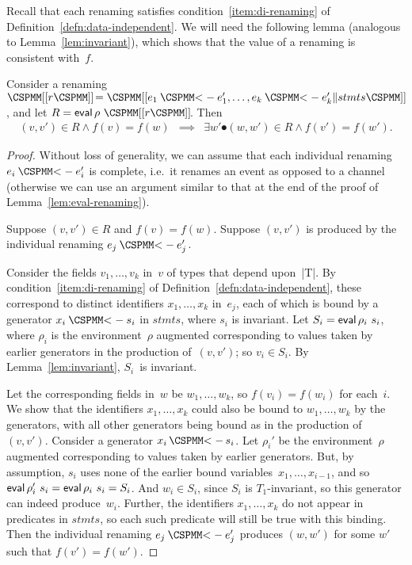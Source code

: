 
Recall that each renaming satisfies condition~\ref{item:di-renaming} of
Definition~\ref{defn:data-independent}.  We will need the following lemma
(analogous to Lemma~\ref{lem:invariant}),
which shows that the value of a renaming is consistent with~$f$.
%
\begin{lemma}
\label{lem:renaming-invariant}
Consider a renaming $\rename{r} = \rename{ e_1 \lArrow e_1', \ldots, e_k
  \lArrow e_k' \| stmts}$, and let $R = \eval \rho~ \rename{r}$.  Then
%
\begin{eqnarray*}
(v,v') \in R \land f(v) = f(w) & \implies &
  \exists w' \spot (w,w') \in R \land f(v') = f(w').
\end{eqnarray*}
\end{lemma}


\begin{proof}
Without loss of generality, we can assume that each individual renaming
$e_i \lArrow e_i'$ is complete, i.e.~it renames an event as opposed to a
channel (otherwise we can use an argument similar to that at the end of the
proof of Lemma~\ref{lem:eval-renaming}).

Suppose $(v,v') \in R$ and $f(v) = f(w)$.  Suppose $(v,v')$ is produced by the
individual renaming $e_j \lArrow e_j'$.  

Consider the fields $v_1,\ldots,v_k$ in~$v$ of types that depend upon~|T|.  By
condition~\ref{item:di-renaming} of Definition~\ref{defn:data-independent},
these correspond to distinct identifiers $x_1,\ldots,x_k$ in~$e_j$, each of
which is bound by a generator $x_i \lArrow s_i$ in $stmts$, where $s_i$ is
invariant.  Let $S_i = \mathop{\sf eval} \rho_i~s_i$, where $\rho_i$ is the
environment~$\rho$ augmented corresponding to values taken by earlier
generators in the production of~$(v,v')$; so $v_i \in S_i$.  By
Lemma~\ref{lem:invariant}, $S_i$~is invariant.

Let the corresponding fields in~$w$ be $w_1,\ldots,w_k$, so $f(v_i) = f(w_i)$
for each~$i$.  We show that the identifiers $x_1,\ldots,x_k$ could also be
bound to $w_1,\ldots,w_k$ by the generators, with all other generators being
bound as in the production of~$(v,v')$.  
Consider a generator $x_i \,\M{<-}\, s_i$.  Let $\rho_i'$ be the
environment~$\rho$ augmented corresponding to values taken by earlier
generators.  But, by assumption, $s_i$ uses none of the earlier bound
variables~$x_1,\ldots,x_{i-1}$, and so $\mathop{\sf eval} \rho_i'~s_i = \mathop{\sf eval} \rho_i~s_i =
S_i$.   And $w_i \in S_i$, since $S_i$ is $T_1$-invariant, so this generator can
indeed produce~$w_i$.  Further, the identifiers $x_1,\ldots,x_k$ do not
appear in predicates in $stmts$, so each such predicate will still be true
with this binding.  Then  the individual renaming $e_j \lArrow e_j'$
produces $(w,w')$ for some $w'$ such that $f(v') = f(w')$.
\end{proof}

